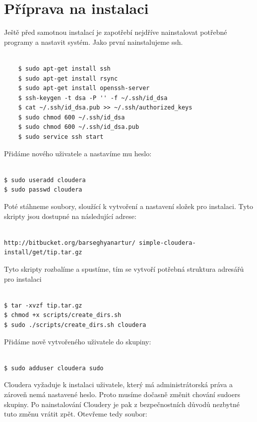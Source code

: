 \documentclass[thesis=M,czech]{FITthesis}[2012/06/26]
\begin{document}
\section{Příprava na instalaci}
Ještě před samotnou instalací je zapotřebí nejdříve nainstalovat potřebné programy a nastavit systém.
Jako první nainstalujeme ssh.
\begin{lstlisting}[frame=single]  % Start your code-block

    $ sudo apt-get install ssh
    $ sudo apt-get install rsync
    $ sudo apt-get install openssh-server
    $ ssh-keygen -t dsa -P '' -f ~/.ssh/id_dsa
    $ cat ~/.ssh/id_dsa.pub >> ~/.ssh/authorized_keys
    $ sudo chmod 600 ~/.ssh/id_dsa
    $ sudo chmod 600 ~/.ssh/id_dsa.pub
    $ sudo service ssh start
\end{lstlisting} 
Přidáme nového uživatele a nastavíme mu heslo:
\begin{lstlisting}[frame=single]  % Start your code-block

$ sudo useradd cloudera
$ sudo passwd cloudera
\end{lstlisting} 

\pagebreak
Poté stáhneme soubory, sloužící k vytvoření a nastavení složek pro instalaci. Tyto skripty jsou dostupné na následující adrese:
\begin{lstlisting}[frame=single]  % Start your code-block

http://bitbucket.org/barseghyanartur/ simple-cloudera-install/get/tip.tar.gz
\end{lstlisting} 

Tyto skripty rozbalíme a spustíme, tím se vytvoří potřebná struktura adresářů pro instalaci
\begin{lstlisting}[frame=single]  % Start your code-block

$ tar -xvzf tip.tar.gz
$ chmod +x scripts/create_dirs.sh
$ sudo ./scripts/create_dirs.sh cloudera
\end{lstlisting} 

Přidáme nově vytvořeného uživatele do skupiny:
\begin{lstlisting}[frame=single]  % Start your code-block

$ sudo adduser cloudera sudo
\end{lstlisting}

Cloudera vyžaduje k instalaci uživatele, který má administrátorská práva a zároveň nemá nastavené heslo. Proto musíme dočasně změnit chování sudoers skupiny. Po nainstalování Cloudery je pak z bezpečnostních důvodů nezbytné tuto změnu vrátit zpět. Otevřeme tedy soubor:
\end{document}
